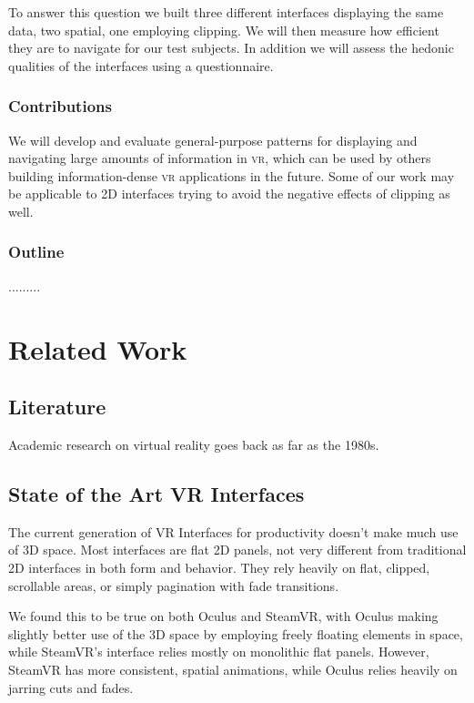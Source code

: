 \documentclass{tufte-book} %
\begin{document}
To answer this question we built three different interfaces displaying the same data, two spatial, one employing clipping. We will then measure how efficient they are to navigate for our test subjects. In addition we will assess the hedonic qualities of the interfaces using a questionnaire.

\subsection{Contributions}
We will develop and evaluate general-purpose patterns for displaying and navigating large amounts of information in \textsc{vr}, which can be used by others building information-dense \textsc{vr} applications in the future. Some of our work may be applicable to 2D interfaces trying to avoid the negative effects of clipping as well.

\subsection{Outline}

.........



\chapter{Related Work}
\label{ch:related-work}

\section{Literature}
Academic research on virtual reality goes back as far as the 1980s.

\section{State of the Art VR Interfaces}
The current generation of VR Interfaces for productivity doesn't make much use of 3D space. Most interfaces are flat 2D panels, not very different from traditional 2D interfaces in both form and behavior. They rely heavily on flat, clipped, scrollable areas, or simply pagination with fade transitions.

We found this to be true on both Oculus and SteamVR, with Oculus making slightly better use of the 3D space by employing freely floating elements in space, while SteamVR's interface relies mostly on monolithic flat panels.
However, SteamVR has more consistent, spatial animations, while Oculus relies heavily on jarring cuts and fades.
\end{document}
